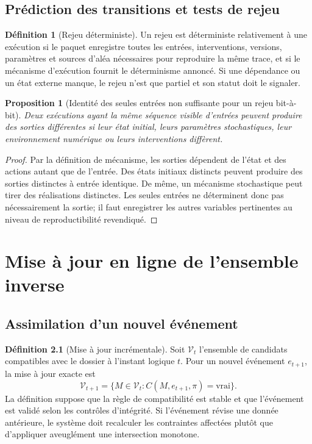 \documentclass[11pt,oneside]{book}
\newtheorem{proposition}[theoreme]{Proposition}
\theoremstyle{definition}
\newtheorem{definition}[theoreme]{Définition}
\theoremstyle{remark}
\newcommand{\1}{\mathbf 1}
\begin{document}
\section{Prédiction des transitions et tests de rejeu}
\begin{definition}[Rejeu déterministe]
Un rejeu est déterministe relativement à une exécution si le paquet enregistre toutes les entrées, interventions, versions, paramètres et sources d'aléa nécessaires pour reproduire la même trace, et si le mécanisme d'exécution fournit le déterminisme annoncé. Si une dépendance ou un état externe manque, le rejeu n'est que partiel et son statut doit le signaler.
\end{definition}

\begin{proposition}[Identité des seules entrées non suffisante pour un rejeu bit-à-bit]
Deux exécutions ayant la même séquence visible d'entrées peuvent produire des sorties différentes si leur état initial, leurs paramètres stochastiques, leur environnement numérique ou leurs interventions diffèrent.
\end{proposition}
\begin{proof}
Par la définition de mécanisme, les sorties dépendent de l'état et des actions autant que de l'entrée. Des états initiaux distincts peuvent produire des sorties distinctes à entrée identique. De même, un mécanisme stochastique peut tirer des réalisations distinctes. Les seules entrées ne déterminent donc pas nécessairement la sortie; il faut enregistrer les autres variables pertinentes au niveau de reproductibilité revendiqué.\end{proof}

\chapter{Mise à jour en ligne de l'ensemble inverse}
\section{Assimilation d'un nouvel événement}
\begin{definition}[Mise à jour incrémentale]
Soit $\mathcal V_t$ l'ensemble de candidats compatibles avec le dossier à l'instant logique $t$. Pour un nouvel événement $e_{t+1}$, la mise à jour exacte est
\[
\mathcal V_{t+1}=\{M\in\mathcal V_t:C(M,e_{t+1},\pi)=\mathrm{vrai}\}.
\]
La définition suppose que la règle de compatibilité est stable et que l'événement est validé selon les contrôles d'intégrité. Si l'événement révise une donnée antérieure, le système doit recalculer les contraintes affectées plutôt que d'appliquer aveuglément une intersection monotone.
\end{definition}
\end{document}

